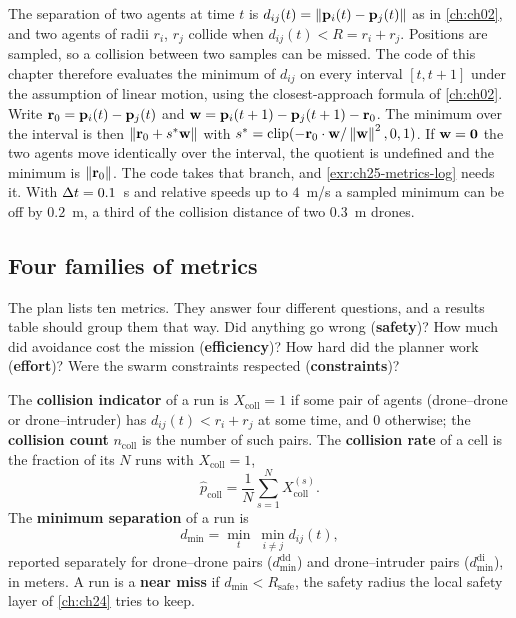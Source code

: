 The separation of two agents at time $t$ is $d_{ij}(t) = \left\lVert \mathbf{p}_i(t) -
\mathbf{p}_j(t) \right\rVert$ as in \cref{ch:ch02}, and two agents of radii $r_i$, $r_j$
collide when $d_{ij}(t) < R = r_i + r_j$. Positions are sampled, so a
collision between two samples can be missed. The code of this chapter
therefore evaluates the minimum of $d_{ij}$ on every interval $[t, t+1]$
under the assumption of linear motion, using the closest-approach formula of
\cref{ch:ch02}. Write $\mathbf{r}_0 = \mathbf{p}_i(t) - \mathbf{p}_j(t)$ and
$\mathbf{w} = \mathbf{p}_i(t+1) - \mathbf{p}_j(t+1) - \mathbf{r}_0$. The minimum over the
interval is then $\left\lVert \mathbf{r}_0 + s^*\mathbf{w} \right\rVert$ with
$s^* = \operatorname{clip}(-\mathbf{r}_0 \cdot \mathbf{w} / \left\lVert \mathbf{w} \right\rVert^2,
0, 1)$. If $\mathbf{w} = \mathbf{0}$ the two agents move identically over the
interval, the quotient is undefined and the minimum is $\left\lVert \mathbf{r}_0 \right\rVert$.
The code takes that branch, and \cref{exr:ch25-metrics-log} needs it. With $\Delta t = 0.1$~s and relative speeds up to $4$~m/s a sampled
minimum can be off by $0.2$~m, a third of the collision distance of two
$0.3$~m drones.

\subsection{Four families of metrics}

The plan lists ten metrics. They answer four different questions, and a
results table should group them that way. Did anything go wrong
(\textbf{safety})? How much did avoidance cost the mission
(\textbf{efficiency})? How hard did the planner work (\textbf{effort})? Were
the swarm constraints respected (\textbf{constraints})?

\begin{definition}
\label{def:ch25-safety}
The \textbf{collision indicator} of a run is
$X_{\mathrm{coll}} = 1$ if some pair of agents (drone--drone or
drone--intruder) has $d_{ij}(t) < r_i + r_j$ at some time, and $0$
otherwise; the \textbf{collision count} $n_{\mathrm{coll}}$ is the number
of such pairs. The \textbf{collision rate} of a cell is the fraction of its
$N$ runs with $X_{\mathrm{coll}} = 1$,
\begin{equation}
  \hat p_{\mathrm{coll}} = \frac{1}{N}\sum_{s=1}^{N} X_{\mathrm{coll}}^{(s)}.
  \label{eq:ch25-collrate}
\end{equation}
The \textbf{minimum separation} of a run is
\begin{equation}
  d_{\min} = \min_{t}\ \min_{i \ne j} d_{ij}(t),
  \label{eq:ch25-dmin}
\end{equation}
reported separately for drone--drone pairs ($d_{\min}^{\mathrm{dd}}$) and
drone--intruder pairs ($d_{\min}^{\mathrm{di}}$), in meters. A run is a
\textbf{near miss} if $d_{\min} < R_{\mathrm{safe}}$, the
safety radius the local safety layer of \cref{ch:ch24} tries to keep.
\end{definition}

